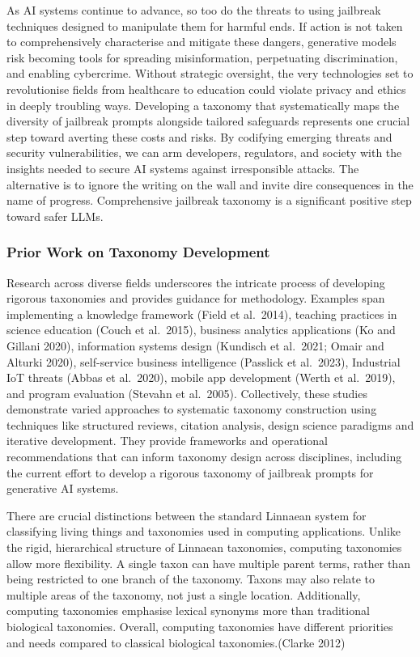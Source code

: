 \documentclass[
  letterpaper,
  DIV=11,
  numbers=noendperiod]{scrartcl}
\begin{document}
As AI systems continue to advance, so too do the threats to using
jailbreak techniques designed to manipulate them for harmful ends. If
action is not taken to comprehensively characterise and mitigate these
dangers, generative models risk becoming tools for spreading
misinformation, perpetuating discrimination, and enabling cybercrime.
Without strategic oversight, the very technologies set to revolutionise
fields from healthcare to education could violate privacy and ethics in
deeply troubling ways. Developing a taxonomy that systematically maps
the diversity of jailbreak prompts alongside tailored safeguards
represents one crucial step toward averting these costs and risks. By
codifying emerging threats and security vulnerabilities, we can arm
developers, regulators, and society with the insights needed to secure
AI systems against irresponsible attacks. The alternative is to ignore
the writing on the wall and invite dire consequences in the name of
progress. Comprehensive jailbreak taxonomy is a significant positive
step toward safer LLMs.

\subsubsection{Prior Work on Taxonomy
Development}\label{prior-work-on-taxonomy-development}

Research across diverse fields underscores the intricate process of
developing rigorous taxonomies and provides guidance for methodology.
Examples span implementing a knowledge framework (Field et al.~2014),
teaching practices in science education (Couch et al.~2015), business
analytics applications (Ko and Gillani 2020), information systems design
(Kundisch et al.~2021; Omair and Alturki 2020), self-service business
intelligence (Passlick et al.~2023), Industrial IoT threats (Abbas et
al.~2020), mobile app development (Werth et al.~2019), and program
evaluation (Stevahn et al.~2005). Collectively, these studies
demonstrate varied approaches to systematic taxonomy construction using
techniques like structured reviews, citation analysis, design science
paradigms and iterative development. They provide frameworks and
operational recommendations that can inform taxonomy design across
disciplines, including the current effort to develop a rigorous taxonomy
of jailbreak prompts for generative AI systems.

There are crucial distinctions between the standard Linnaean system for
classifying living things and taxonomies used in computing applications.
Unlike the rigid, hierarchical structure of Linnaean taxonomies,
computing taxonomies allow more flexibility. A single taxon can have
multiple parent terms, rather than being restricted to one branch of the
taxonomy. Taxons may also relate to multiple areas of the taxonomy, not
just a single location. Additionally, computing taxonomies emphasise
lexical synonyms more than traditional biological taxonomies. Overall,
computing taxonomies have different priorities and needs compared to
classical biological taxonomies.(Clarke 2012)
\end{document}
